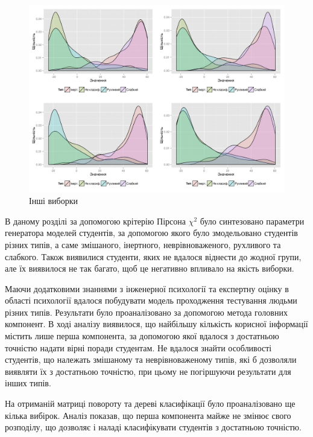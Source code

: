 \begin{figure}[h]
  \centering
    \includegraphics[width=\textwidth]{images/pca_hists_test}
  \caption{Інші виборки}
  \label{fig:tree:test}
\end{figure}

\chapterConclusion

В даному розділі за допомогою крітерію Пірсона $\chi^2$ було синтезовано
параметри генератора моделей студентів, за допомогою якого було змодельовано
студентів різних типів, а саме змішаного, інертного, неврівноваженого,
рухливого та слабкого.
Також виявилися студенти, яких не вдалося віднести до жодної групи,
але їх виявилося не так багато, щоб це негативно впливало на якість виборки.

Маючи додатковими знаннями з інженерної психології та експертну оцінку
в області психології вдалося побудувати модель проходження тестування
людьми різних типів.
Результати було проаналізовано за допомогою метода головних компонент.
В ході аналізу виявилося, що найбільшу кількість корисної інформації
містить лише перша компонента, за допомогою якої вдалося з достатньою
точністю надати вірні поради студентам.
Не вдалося знайти особливості студентів, що належать змішаному та
неврівноваженому типів, які б дозволяли виявляти їх з достатньою точністю,
при цьому не погіршуючи результати для інших типів.

На отриманій матриці повороту та дереві класифікації було проаналізовано
ще кілька вибірок.
Аналіз показав, що перша компонента майже не змінює свого розподілу, що
дозволяє і наладі класифікувати студентів з достатньою точністю.
